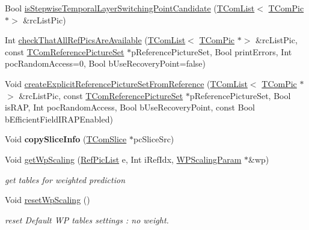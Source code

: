 \begin{DoxyCompactItemize}
Bool \hyperlink{class_t_com_slice_a97b3d5d733b666f3f432041910dc8aae}{is\+Stepwise\+Temporal\+Layer\+Switching\+Point\+Candidate} (\hyperlink{class_t_com_list}{T\+Com\+List}$<$ \hyperlink{class_t_com_pic}{T\+Com\+Pic} $\ast$$>$ \&rc\+List\+Pic)
\item 
Int \hyperlink{class_t_com_slice_a7e209d103c42543b321bd2c370749d43}{check\+That\+All\+Ref\+Pics\+Are\+Available} (\hyperlink{class_t_com_list}{T\+Com\+List}$<$ \hyperlink{class_t_com_pic}{T\+Com\+Pic} $\ast$$>$ \&rc\+List\+Pic, const \hyperlink{class_t_com_reference_picture_set}{T\+Com\+Reference\+Picture\+Set} $\ast$p\+Reference\+Picture\+Set, Bool print\+Errors, Int poc\+Random\+Access=0, Bool b\+Use\+Recovery\+Point=false)
\item 
Void \hyperlink{class_t_com_slice_a9dd70038c6ecdc52638d2f4261b3f2b3}{create\+Explicit\+Reference\+Picture\+Set\+From\+Reference} (\hyperlink{class_t_com_list}{T\+Com\+List}$<$ \hyperlink{class_t_com_pic}{T\+Com\+Pic} $\ast$$>$ \&rc\+List\+Pic, const \hyperlink{class_t_com_reference_picture_set}{T\+Com\+Reference\+Picture\+Set} $\ast$p\+Reference\+Picture\+Set, Bool is\+R\+AP, Int poc\+Random\+Access, Bool b\+Use\+Recovery\+Point, const Bool b\+Efficient\+Field\+I\+R\+A\+P\+Enabled)
\item 
\mbox{\label{class_t_com_slice_abcaf372f86a26d674e596127c866ffd2}} 
Void {\bfseries copy\+Slice\+Info} (\hyperlink{class_t_com_slice}{T\+Com\+Slice} $\ast$pc\+Slice\+Src)
\item 
\mbox{\label{class_t_com_slice_abc0fa7bb5c165487482f48b98bc4a66e}} 
Void \hyperlink{class_t_com_slice_abc0fa7bb5c165487482f48b98bc4a66e}{get\+Wp\+Scaling} (\hyperlink{_type_def_8h_a93cea48eb9dcfd661168dee82e41b384}{Ref\+Pic\+List} e, Int i\+Ref\+Idx, \hyperlink{struct_w_p_scaling_param}{W\+P\+Scaling\+Param} $\ast$\&wp)
\begin{DoxyCompactList}\small\item\em get tables for weighted prediction \end{DoxyCompactList}\item 
\mbox{\label{class_t_com_slice_a7ef4b01d0b4803aaeb8c9b8f587045d2}} 
Void \hyperlink{class_t_com_slice_a7ef4b01d0b4803aaeb8c9b8f587045d2}{reset\+Wp\+Scaling} ()
\begin{DoxyCompactList}\small\item\em reset Default WP tables settings \+: no weight. \end{DoxyCompactList}\item 
$$
\end{DoxyCompactItemize}
